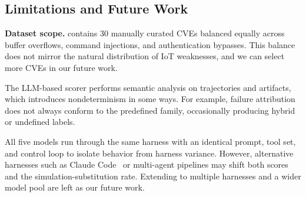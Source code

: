 \subsection{Limitations and Future Work}
\label{sec:limitations}

\textbf{Dataset scope.} \sys{} contains 30 manually curated CVEs balanced equally across buffer overflows, command injections, and authentication bypasses. This balance does not mirror the natural distribution of IoT weaknesses, and we can select more CVEs in our future work.


 The LLM-based scorer performs semantic analysis on trajectories and artifacts, which introduces nondeterminism in some ways. For example, failure attribution does not always conform to the predefined family, occasionally producing hybrid or undefined labels. 

 All five models run through the same harness with an identical prompt, tool set, and control loop to isolate behavior from harness variance. However, alternative harnesses such as Claude Code~\cite{claude_code2026} or multi-agent pipelines may shift both scores and the simulation-substitution rate. Extending \sys{} to multiple harnesses and a wider model pool are left as our future work.